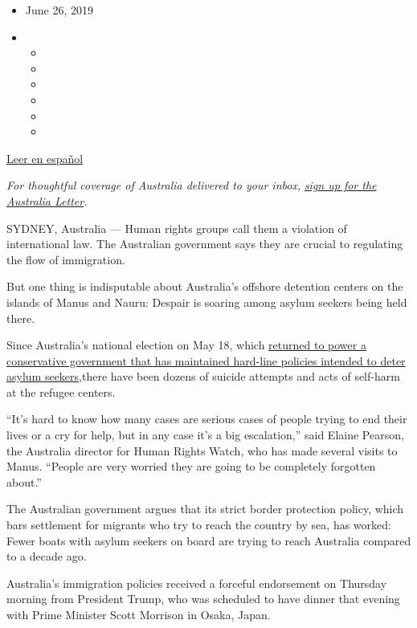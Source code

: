 \begin{itemize}
\item
  June 26, 2019
\item
  \begin{itemize}
  \item
  \item
  \item
  \item
  \item
  \item
  \end{itemize}
\end{itemize}

\href{https://www.nytimes.com/es/2019/06/30/detencion-extraterritorial-australia/}{Leer
en español}

\emph{For thoughtful coverage of Australia delivered to your inbox,}
\href{https://www.nytimes.com/newsletters/australia-letter?module=inline}{\emph{sign
up for the Australia Letter}}\emph{.}

SYDNEY, Australia --- Human rights groups call them a violation of
international law. The Australian government says they are crucial to
regulating the flow of immigration.

But one thing is indisputable about Australia's offshore detention
centers on the islands of Manus and Nauru: Despair is soaring among
asylum seekers being held there.

Since Australia's national election on May 18, which
\href{https://www.nytimes.com/2019/05/18/world/australia/election-results-scott-morrison.html}{returned
to power a conservative government that has maintained hard-line
policies intended to deter asylum seekers,}there have been dozens of
suicide attempts and acts of self-harm at the refugee centers.

``It's hard to know how many cases are serious cases of people trying to
end their lives or a cry for help, but in any case it's a big
escalation,'' said Elaine Pearson, the Australia director for Human
Rights Watch, who has made several visits to Manus. ``People are very
worried they are going to be completely forgotten about.''

The Australian government argues that its strict border protection
policy, which bars settlement for migrants who try to reach the country
by sea, has worked: Fewer boats with asylum seekers on board are trying
to reach Australia compared to a decade ago.

Australia's immigration policies received a forceful endorsement on
Thursday morning from President Trump, who was scheduled to have dinner
that evening with Prime Minister Scott Morrison in Osaka, Japan.

